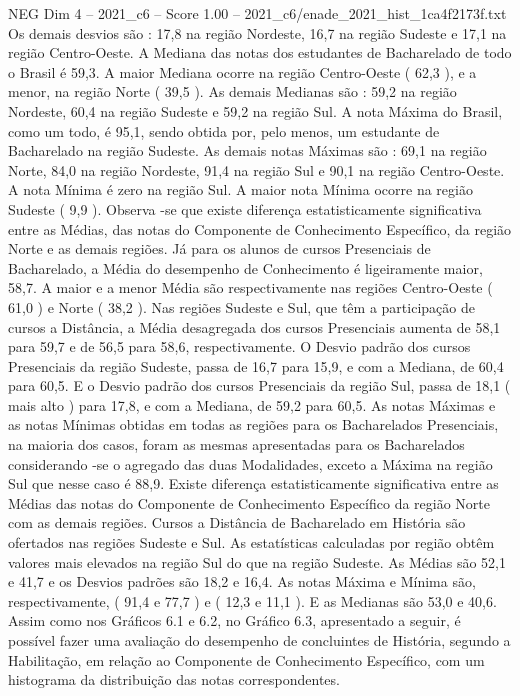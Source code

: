 \begin{textsample}{NEG Dim 4 – 2021\_c6 – Score 1.00 – 2021\_c6/enade\_2021\_hist\_1ca4f2173f.txt}
Os demais desvios são : 17,8 na região Nordeste, 16,7 na região Sudeste e 17,1 na região Centro-Oeste.
A Mediana das notas dos estudantes de Bacharelado de todo o Brasil é 59,3.
A maior Mediana ocorre na região Centro-Oeste ( 62,3 ), e a menor, na região Norte ( 39,5 ).
As demais Medianas são : 59,2 na região Nordeste, 60,4 na região Sudeste e 59,2 na região Sul.
A nota Máxima do Brasil, como um todo, é 95,1, sendo obtida por, pelo menos, um estudante de Bacharelado na região Sudeste.
As demais notas Máximas são : 69,1 na região Norte, 84,0 na região Nordeste, 91,4 na região Sul e 90,1 na região Centro-Oeste.
A nota Mínima é zero na região Sul.
A maior nota Mínima ocorre na região Sudeste ( 9,9 ).
Observa -se que existe diferença estatisticamente significativa entre as Médias, das notas do Componente de Conhecimento Específico, da região Norte e as demais regiões.
Já para os alunos de cursos Presenciais de Bacharelado, a Média do desempenho de Conhecimento é ligeiramente maior, 58,7.
A maior e a menor Média são respectivamente nas regiões Centro-Oeste ( 61,0 ) e Norte ( 38,2 ).
Nas regiões Sudeste e Sul, que têm a participação de cursos a Distância, a Média desagregada dos cursos Presenciais aumenta de 58,1 para 59,7 e de 56,5 para 58,6, respectivamente.
O Desvio padrão dos cursos Presenciais da região Sudeste, passa de 16,7 para 15,9, e com a Mediana, de 60,4 para 60,5.
E o Desvio padrão dos cursos Presenciais da região Sul, passa de 18,1 ( mais alto ) para 17,8, e com a Mediana, de 59,2 para 60,5.
As notas Máximas e as notas Mínimas obtidas em todas as regiões para os Bacharelados Presenciais, na maioria dos casos, foram as mesmas apresentadas para os Bacharelados considerando -se o agregado das duas Modalidades, exceto a Máxima na região Sul que nesse caso é 88,9.
Existe diferença estatisticamente significativa entre as Médias das notas do Componente de Conhecimento Específico da região Norte com as demais regiões.
Cursos a Distância de Bacharelado em História são ofertados nas regiões Sudeste e Sul.
As estatísticas calculadas por região obtêm valores mais elevados na região Sul do que na região Sudeste.
As Médias são 52,1 e 41,7 e os Desvios padrões são 18,2 e 16,4.
As notas Máxima e Mínima são, respectivamente, ( 91,4 e 77,7 ) e ( 12,3 e 11,1 ).
E as Medianas são 53,0 e 40,6.
Assim como nos Gráficos 6.1 e 6.2, no Gráfico 6.3, apresentado a seguir, é possível fazer uma avaliação do desempenho de concluintes de História, segundo a Habilitação, em relação ao Componente de Conhecimento Específico, com um histograma da distribuição das notas correspondentes.

\end{textsample}
